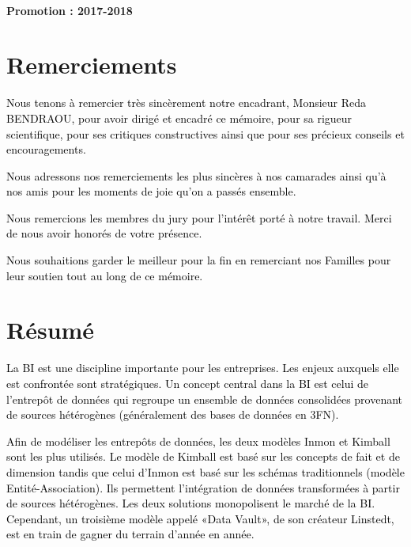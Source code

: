 \documentclass[a4paper,12pt]{report}
\begin{document}
		~~\\
		\vskip 0.3in
		\begin{center}
			\vspace{0.3cm} \textbf{Promotion : 2017-2018}
		\end{center}
	\newpage

\newpage
\chapter*{Remerciements}


\textcolor{black}{Nous tenons à remercier très sincèrement notre encadrant, Monsieur Reda BENDRAOU, pour avoir dirigé et encadré ce mémoire, pour sa rigueur scientifique, pour ses critiques constructives ainsi que pour ses précieux conseils et encouragements.}


\textcolor{black}{Nous adressons nos remerciements les plus sincères à nos camarades ainsi qu’à nos amis pour les moments de joie qu’on a passés ensemble.}



\textcolor{black}{Nous remercions les membres du jury pour l’intérêt porté à notre travail. 
Merci de nous avoir honorés de votre présence.}



\textcolor{black}{Nous souhaitions garder le meilleur pour la fin en remerciant nos Familles pour leur soutien tout au long de ce mémoire.
}





\newpage
\chapter*{Résumé}

\textcolor{black}{La BI est une  discipline importante pour les entreprises. Les enjeux auxquels elle est confrontée sont stratégiques. Un concept central dans la BI est celui de l’entrepôt de données qui regroupe un ensemble de données consolidées provenant de sources hétérogènes (généralement des bases de données en 3FN). }

\textcolor{black}{Afin de  modéliser les entrepôts de données, les deux  modèles  Inmon  et Kimball  sont les plus utilisés. Le modèle de Kimball est basé sur les concepts de fait et de dimension tandis que celui d’Inmon est basé sur les schémas traditionnels (modèle Entité-Association). Ils permettent l’intégration de données transformées à partir de sources hétérogènes. Les deux solutions monopolisent le marché de la BI. Cependant, un troisième modèle appelé «Data Vault», de son créateur Linstedt, est en train de gagner du terrain d’année en année. 
}
\end{document}
